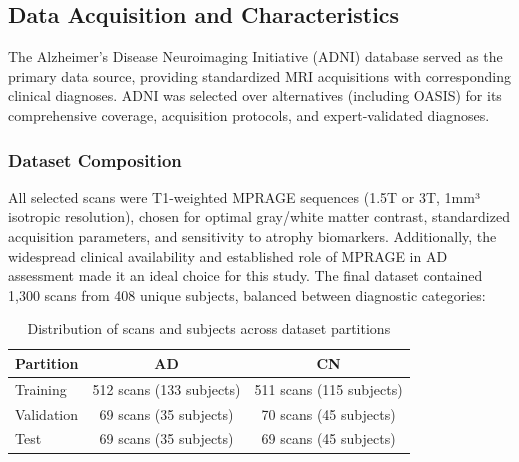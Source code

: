 \documentclass[12pt, a4paper]{article}
\begin{document}




\subsection{Data Acquisition and Characteristics}

The Alzheimer's Disease Neuroimaging Initiative (ADNI) database served as the primary data source, providing standardized MRI acquisitions with corresponding clinical diagnoses. ADNI was selected over alternatives (including OASIS) for its comprehensive coverage, acquisition protocols, and expert-validated diagnoses. 

\subsubsection{Dataset Composition}

All selected scans were T1-weighted MPRAGE sequences (1.5T or 3T, 1mm³ isotropic resolution), chosen for optimal gray/white matter contrast, standardized acquisition parameters, and sensitivity to atrophy biomarkers. Additionally, the widespread clinical availability and established role of MPRAGE in AD assessment made it an ideal choice for this study. The final dataset contained 1,300 scans from 408 unique subjects, balanced between diagnostic categories:

\begin{table}[h]
\centering
\begin{tabular}{|l|c|c|}
\hline
\textbf{Partition} & \textbf{AD} & \textbf{CN} \\
\hline
Training & 512 scans (133 subjects) & 511 scans (115 subjects) \\
Validation & 69 scans (35 subjects) & 70 scans (45 subjects) \\
Test & 69 scans (35 subjects) & 69 scans (45 subjects) \\
\hline
\end{tabular}
\caption{Distribution of scans and subjects across dataset partitions}
\end{table}
\end{document}
